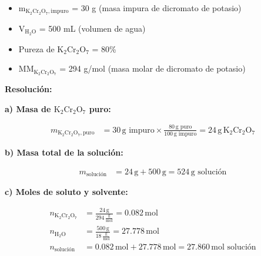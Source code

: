 \documentclass{article}
\begin{document}
\textbf{} %
\begin{itemize}
\item m$_{\text{K}_2\text{Cr}_2\text{O}_7, \text{impuro}}$ = 30 g (masa impura de dicromato de potasio)
\item V$_{\text{H}_2\text{O}}$ = 500 mL (volumen de agua)
\item Pureza de $\text{K}_2\text{Cr}_2\text{O}_7$ = 80\%
\item MM$_{\text{K}_2\text{Cr}_2\text{O}_7}$ = 294 g/mol (masa molar de dicromato de potasio)
\end{itemize}


\noindent\textbf{Resolución:} %

\textbf{a) Masa de $\text{K}_2\text{Cr}_2\text{O}_7$ puro:}

\begin{align*}
    m_{\text{K}_2\text{Cr}_2\text{O}_7, \text{puro}} &= 30 \, \text{g impuro} \times \frac{80 \, \text{g puro}}{100 \, \text{g impuro}} = 24 \, \text{g} \, \text{K}_2\text{Cr}_2\text{O}_7
\end{align*}

\textbf{b) Masa total de la solución:}

\begin{align*}
    m_{\text{solución}} &= 24 \, \text{g} + 500 \, \text{g} = 524 \, \text{g solución}
\end{align*}

\textbf{c) Moles de soluto y solvente:}

\begin{align*}
    n_{\text{K}_2\text{Cr}_2\text{O}_7} &= \frac{24 \, \text{g}}{294 \, \frac{\text{g}}{\text{mol}}} = 0.082 \, \text{mol} \\[10pt]
    n_{\text{H}_2\text{O}} &= \frac{500 \, \text{g}}{18 \, \frac{\text{g}}{\text{mol}}} = 27.778 \, \text{mol} \\[10pt]
    n_{\text{solución}} &= 0.082 \, \text{mol} + 27.778 \, \text{mol} = 27.860 \, \text{mol solución}
\end{align*}

\end{document}

